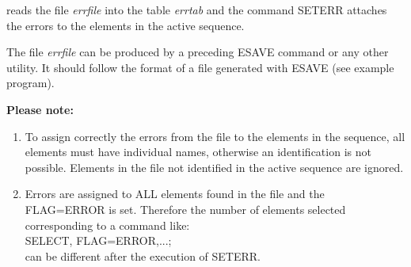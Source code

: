 reads the file \textit{errfile} into the table \textit{errtab} and the
command SETERR attaches the errors to the elements in the active
sequence.  

The file \textit{errfile} can be produced by a preceding ESAVE command
or any other utility. It should follow the format of a file generated
with ESAVE (see example program). 

{\bf Please note:}
\begin{enumerate}
   \item To assign correctly the errors from the file to the elements in
     the sequence, all elements must have individual names, otherwise an
     identification is not possible. Elements in the file not identified
     in the active sequence are ignored.  
   \item Errors are assigned to ALL elements found in the file and the
     FLAG=ERROR is set. Therefore the number of elements selected
     corresponding to a command like:  
     \\ SELECT, FLAG=ERROR,...;
     \\ can be different after the execution of SETERR. 
\end{enumerate}



